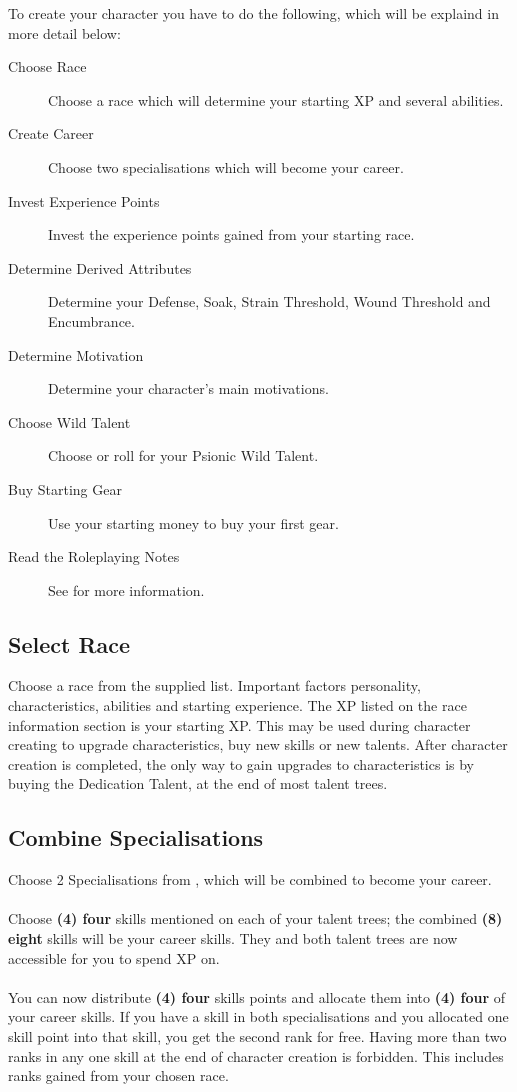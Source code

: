\begin{multicols}{2}

To create your character you have to do the following, which will be explaind in more detail below:

\begin{description}
    \item [Choose Race] Choose a race which will determine your starting XP and several abilities.
    \item [Create Career] Choose two specialisations which will become your career.
    \item [Invest Experience Points] Invest the experience points gained from your starting race.
    \item [Determine Derived Attributes] Determine your Defense, Soak, Strain Threshold, Wound Threshold and Encumbrance.
    \item [Determine Motivation] Determine your character's main motivations.
    \item [Choose Wild Talent] Choose or roll for your Psionic Wild Talent.
    \item [Buy Starting Gear] Use your starting money to buy your first gear.
    \item [Read the Roleplaying Notes] See  for more information.
\end{description}

\subsection{Select Race}
Choose a race from the supplied list. Important factors personality, characteristics, abilities and starting experience.
The XP listed on the race information section is your starting XP. This may be used during character creating to upgrade characteristics, buy new skills or new talents.
After character creation is completed, the only way to gain upgrades to characteristics is by buying the Dedication Talent, at the end of most talent trees.

\subsection{Combine Specialisations}
Choose 2 Specialisations from , which will be combined to become your career.\\
\\
Choose \textbf{(4) four} skills mentioned on each of your talent trees; the combined \textbf{(8) eight} skills will be
your career skills. They and both talent trees are now accessible for you to spend XP on.\\
\\
You can now distribute \textbf{(4) four} skills points and allocate them into \textbf{(4) four} of your career skills.
If you have a skill in both specialisations and you allocated one skill point into that skill,
you get the second rank for free. Having more than two ranks in any one skill at the end of
character creation is forbidden. This includes ranks gained from your chosen race.


\end{multicols}
